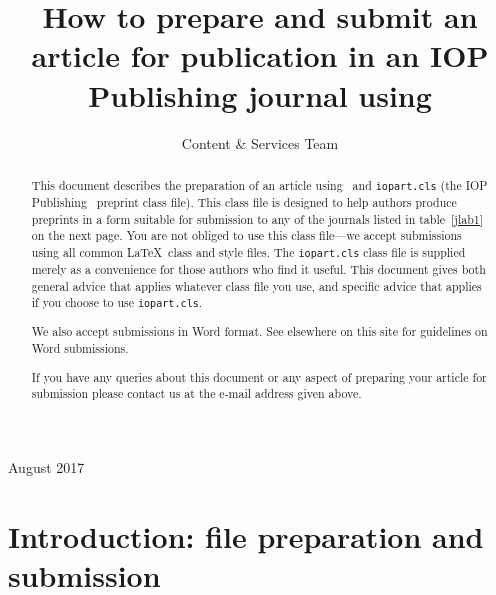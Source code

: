 \documentclass[12pt]{iopart}
\begin{document}
\title[Author guidelines for IOP Publishing journals in  \LaTeXe]{How to prepare and submit an article for 
publication in an IOP Publishing journal using \LaTeXe}

\author{Content \& Services Team}

\address{IOP Publishing, Temple Circus, Temple Way, Bristol BS1 6HG, UK}
\vspace{10pt}
\begin{indented}
\item[]August 2017
\end{indented}

\begin{abstract}
This document describes the  preparation of an article using \LaTeXe\ and 
\verb"iopart.cls" (the IOP Publishing \LaTeXe\ preprint class file).
This class file is designed to help 
authors produce preprints in a form suitable for submission to any of the
journals listed in table~\ref{jlab1} on the next page.  You are not obliged to use this class file---we accept
submissions using all common \LaTeX\ class and style files.  The \verb"iopart.cls"
class file is supplied merely as a convenience for those authors who find it useful.
This document gives both general advice that applies whatever class file you use, and specific advice
that applies if you choose to use \verb"iopart.cls".

We also accept submissions in Word format.  See elsewhere on this site for guidelines on Word submissions.

If you have any queries about this document or any aspect of preparing your article for submission please contact us at the e-mail address given above.
\end{abstract}

%
%
%
% 
%



\section{Introduction: file preparation and submission}
\end{document}
